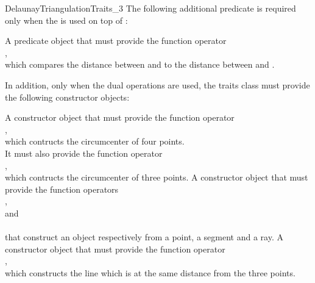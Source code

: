 \begin{ccRefConcept}{DelaunayTriangulationTraits_3}
The following additional predicate is required only when the 
 is used on top of 
: 

{A predicate object that must provide the function operator\\
,\\
which compares the distance between  and  to the distance
between  and .}

In addition, only when the dual operations are used, the traits class
must provide the following constructor objects: 

{A constructor object that must provide the function operator\\
,\\
which contructs the circumcenter of four points.
\\
It must also provide the function operator\\
,\\
which contructs the circumcenter of three points.
}
\ccGlue
{}
{A constructor object that must provide the function operators\\
,\\
 and\\
\\
that construct an object respectively from a point, a segment and a ray.}
\ccGlue
{}
{A constructor object that must provide the function operator\\
,\\
which constructs the line which is at the same distance from the three points.}
\ccGlue

\end{ccRefConcept}
